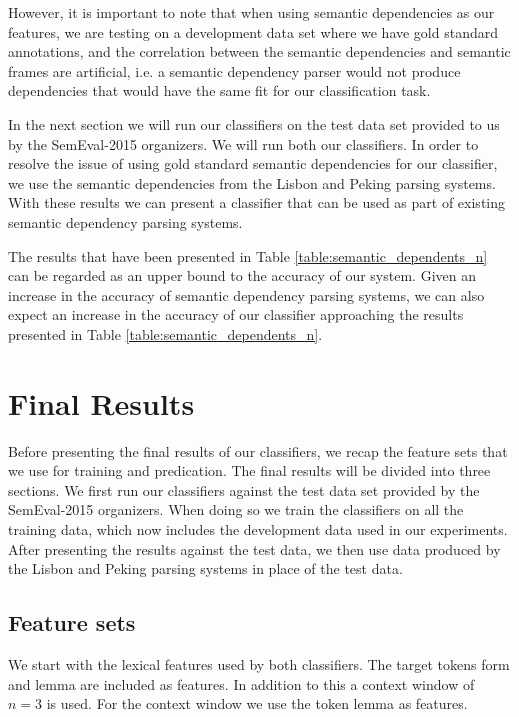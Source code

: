 However, it is important to note that when using semantic dependencies as our features, we are testing on a development data set where we have gold standard annotations, and the correlation between the semantic dependencies and semantic frames are artificial, i.e. a semantic dependency parser would not produce dependencies that would have the same fit for our classification task. 

In the next section we will run our classifiers on the test data set provided to us by the SemEval-2015 organizers. We will run both our classifiers. In order to resolve the issue of using gold standard semantic dependencies for our classifier, we use the semantic dependencies from the Lisbon and Peking parsing systems. With these results we can present a classifier that can be used as part of existing semantic dependency parsing systems. 

The results that have been presented in Table \ref{table:semantic_dependents_n} can be regarded as an upper bound to the accuracy of our system. Given an increase in the accuracy of semantic dependency parsing systems, we can also expect an increase in the accuracy of our classifier approaching the results presented in Table \ref{table:semantic_dependents_n}. 


\section{Final Results}
\label{results_final}

Before presenting the final results of our classifiers, we recap the feature sets that we use for training and predication. The final results will be divided into three sections. We first run our classifiers against the test data set provided by the SemEval-2015 organizers. When doing so we train the classifiers on all the training data, which now includes the development data used in our experiments. After presenting the results against the test data, we then use data produced by the Lisbon and Peking parsing systems in place of the test data. 

\subsection{Feature sets}

We start with the lexical features used by both classifiers. The target tokens form and lemma are included as features. In addition to this a context window of $n=3$ is used. For the context window we use the token lemma as features.

